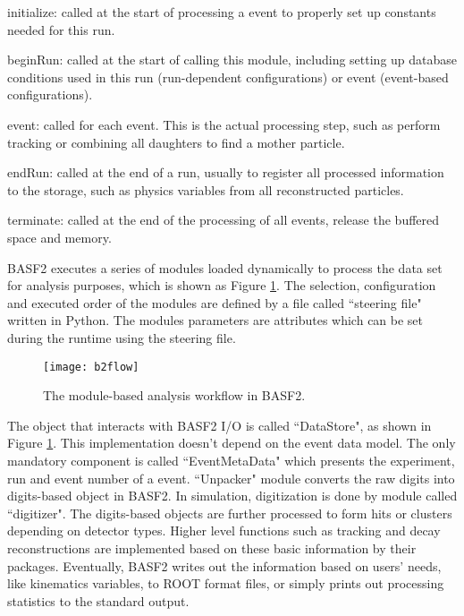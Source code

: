 \textbullet \space initialize: called at the start of processing a event to properly set up constants needed for this run.

\textbullet \space beginRun: called at the start of calling this module, including setting up database conditions used in this run (run-dependent configurations) or event (event-based configurations).

\textbullet \space event: called for each event. This is the actual processing step, such as perform tracking or combining all daughters to find a mother particle. 

\textbullet \space endRun: called at the end of a run, usually to register all processed information to the storage, such as physics variables from all reconstructed particles.

\textbullet \space terminate: called at the end of the processing of all events, release the buffered space and memory.

BASF2 executes a series of modules loaded dynamically to process the data set for analysis purposes, which is shown as Figure \ref{fig:b2flow}. The selection, configuration and executed order of the modules are defined by a file called ``steering file" written in Python. The modules parameters are attributes which can be set during the runtime using the steering file. 
\begin{comment}
For example, the ``Path" object declared in a steering file stores the sequence of modules that will be executed, to which allow other modules such as ``mdstInput" or ``reconstructDecay" to be added.
Users can use ``boolean" type variable set in ``event" function to create a conditional branch of a ``Path" in case that one event needs to be processed with different modules at the same time. For instance, in the decay reconstruction package, if a decay chain is not fulfilled by missing one particle in the ``event" functions, other back-up decay chains can be checked to see if a successful reconstruction is possible.  
\end{comment}


\begin{figure}[htpb]
	\centering
	\texttt{[image: b2flow]}
	\caption{The module-based analysis workflow in BASF2.}
	\label{fig:b2flow}
\end{figure}

The object that interacts with BASF2 I/O is called ``DataStore", as shown in Figure \ref{fig:b2flow}. This implementation doesn't depend on the event data model. The only mandatory component is called ``EventMetaData" which presents the experiment, run  and event number of a event. ``Unpacker" module converts the raw digits into digits-based object in BASF2. In simulation, digitization is done by module called ``digitizer". The digits-based objects are further processed to form hits or clusters depending on detector types. Higher level functions such as tracking and decay reconstructions are implemented based on these basic information by their packages. Eventually, BASF2 writes out the information based on users' needs, like kinematics variables, to ROOT\cite{ROOTcern} format files, or simply prints out processing statistics to the standard output. 

